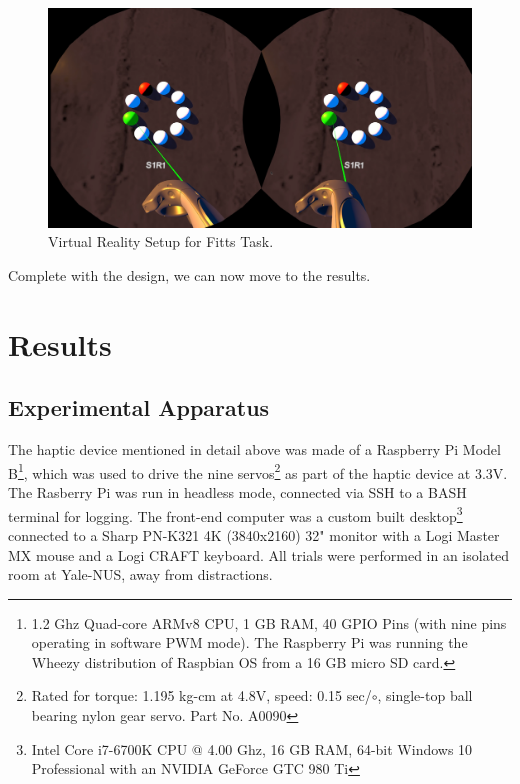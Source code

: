 \documentclass[
hidelinks,
12pt, %
oneside, %
english, %
doublespacing, %
headsepline, %
]{MastersDoctoralThesis} %
\begin{document}
\begin{enumerate}
	\begin{figure}[h]
		\centering\includegraphics[width=1\linewidth]{images/vrfittsscreenshot.png}
		\decoRule
		\caption[Virtual Reality Setup]{Virtual Reality Setup for Fitts Task.}
		\label{fig:vrfittss}
	\end{figure}



\end{enumerate}

Complete with the design, we can now move to the results.

\chapter{Results}
\label{Results}

\section{Experimental Apparatus}

The haptic device mentioned in detail above was made of a Raspberry Pi Model B\footnote{1.2 Ghz Quad-core ARMv8 CPU, 1 GB RAM, 40 GPIO Pins (with nine pins operating in software PWM mode). The Raspberry Pi was running the Wheezy distribution of Raspbian OS from a 16 GB micro SD card.}, which was used to drive the nine servos\footnote{Rated for torque: 1.195 kg-cm at 4.8V, speed: 0.15 sec/$\circ$, single-top ball bearing nylon gear servo. Part No. A0090} as part of the haptic device at 3.3V. The Rasberry Pi was run in headless mode, connected via SSH to a BASH terminal for logging. The front-end computer was a custom built desktop\footnote{Intel Core i7-6700K CPU @ 4.00 Ghz, 16 GB RAM, 64-bit Windows 10 Professional with an NVIDIA GeForce GTC 980 Ti} connected to a Sharp PN-K321 4K (3840x2160) 32" monitor with a Logi Master MX mouse and a Logi CRAFT keyboard. All trials were performed in an isolated room at Yale-NUS, away from distractions.
\end{document}
